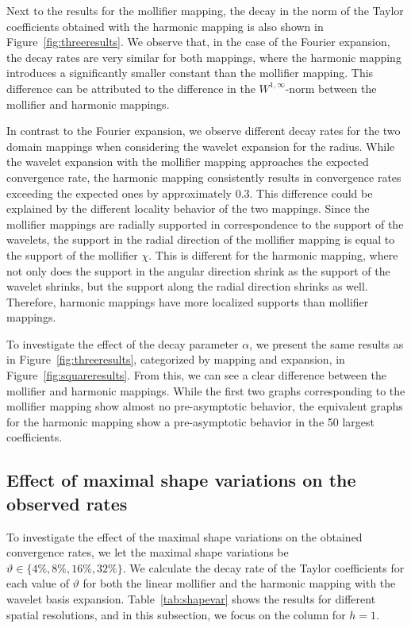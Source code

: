 Next to the results for the mollifier mapping, the decay in the norm of the Taylor coefficients obtained with the harmonic mapping is also shown in Figure~\ref{fig:threeresults}.
We observe that, in the case of the Fourier expansion, the decay rates are very similar for both mappings, where the harmonic mapping introduces a significantly smaller constant than the mollifier mapping.
This difference can be attributed to the difference in the $W^{1,\infty}$-norm between the mollifier and harmonic mappings.

In contrast to the Fourier expansion, we observe different decay rates for the two domain mappings when considering the wavelet expansion for the radius.
While the wavelet expansion with the mollifier mapping approaches the expected convergence rate, the harmonic mapping consistently results in convergence rates exceeding the expected ones by approximately $0.3$.
This difference could be explained by the different locality behavior of the two mappings.
Since the mollifier mappings are radially supported in correspondence to the support of the wavelets, the support in the radial direction of the mollifier mapping is equal to the support of the mollifier $\chi$.
This is different for the harmonic mapping, where not only does the support in the angular direction shrink as the support of the wavelet shrinks, but the support along the radial direction shrinks as well.
Therefore, harmonic mappings have more localized supports than mollifier mappings.

To investigate the effect of the decay parameter $\alpha$, we present the same results as in Figure~\ref{fig:threeresults}, categorized by mapping and expansion, in Figure~\ref{fig:squareresults}.
From this, we can see a clear difference between the mollifier and harmonic mappings.
While the first two graphs corresponding to the mollifier mapping show almost no pre-asymptotic behavior, the equivalent graphs for the harmonic mapping show a pre-asymptotic behavior in the 50 largest coefficients.

\subsection{Effect of maximal shape variations on the observed rates}
\label{sec:shapevar}
To investigate the effect of the maximal shape variations on the obtained convergence rates, we let the maximal shape variations be $\vartheta \in \{4\%, 8\%, 16\%, 32\% \}$.
We calculate the decay rate of the Taylor coefficients for each value of $\vartheta$ for both the linear mollifier and the harmonic mapping with the wavelet basis expansion.
Table~\ref{tab:shapevar} shows the results for different spatial resolutions, and in this subsection, we focus on the column for $h=1$.

